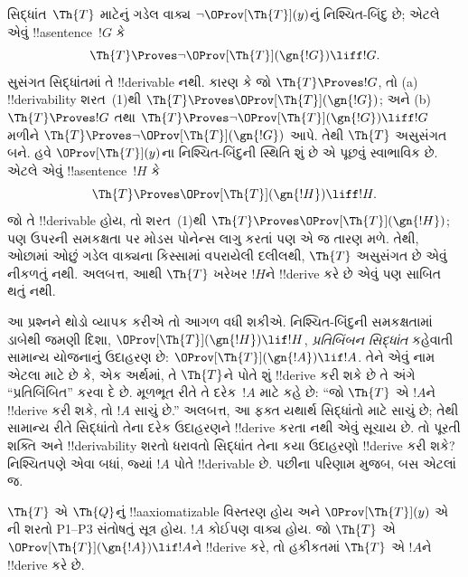 \documentclass[../../../include/open-logic-section]{subfiles}
\begin{document}


સિદ્ધાંત~$\Th{T}$ માટેનું ગડેલ વાક્ય $\lnot\OProv[\Th{T}](y)$નું નિશ્ચિત-બિંદુ છે; એટલે એવું !!a{sentence}~$!G$ કે
\[
\Th{T} \Proves \lnot \OProv[\Th{T}](\gn{!G}) \liff !G.
\]
સુસંગત સિદ્ધાંતમાં તે !!{derivable} નથી. કારણ કે જો $\Th{T} \Proves !G$, તો (a) !!{derivability} શરત~(1)થી $\Th{T} \Proves \OProv[\Th{T}](\gn{!G})$; અને (b) $\Th{T} \Proves !G$ તથા $\Th{T} \Proves \lnot \OProv[\Th{T}](\gn{!G}) \liff !G$ મળીને $\Th{T} \Proves \lnot \OProv[\Th{T}](\gn{!G})$ આપે. તેથી $\Th{T}$ અસુસંગત બને. હવે $\OProv[\Th{T}](y)$ના નિશ્ચિત-બિંદુની સ્થિતિ શું છે એ પૂછવું સ્વાભાવિક છે. એટલે એવું !!a{sentence}~$!H$ કે
\[
\Th{T} \Proves \OProv[\Th{T}](\gn{!H}) \liff !H.
\]
જો તે !!{derivable} હોય, તો શરત~(1)થી $\Th{T} \Proves \OProv[\Th{T}](\gn{!H})$; પણ ઉપરની સમકક્ષતા પર મોડસ પોનેન્સ લાગુ કરતાં પણ એ જ તારણ મળે. તેથી, ઓછામાં ઓછું ગડેલ વાક્યના કિસ્સામાં વપરાયેલી દલીલથી, $\Th{T}$ અસુસંગત છે એવું નીકળતું નથી. અલબત્ત, આથી $\Th{T}$ ખરેખર $!H$ને !!{derive} કરે છે એવું પણ સાબિત થતું નથી.

આ પ્રશ્નને થોડો વ્યાપક કરીએ તો આગળ વધી શકીએ. નિશ્ચિત-બિંદુની સમકક્ષતામાં ડાબેથી જમણી દિશા, $\OProv[\Th{T}](\gn{!H}) \lif !H$, \emph{પ્રતિબિંબન સિદ્ધાંત} કહેવાતી સામાન્ય યોજનાનું ઉદાહરણ છે: $\OProv[\Th{T}](\gn{!A}) \lif !A$. તેને એવું નામ એટલા માટે છે કે, એક અર્થમાં, તે $\Th{T}$ને પોતે શું !!{derive} કરી શકે છે તે અંગે ``પ્રતિબિંબિત'' કરવા દે છે. મૂળભૂત રીતે તે દરેક~$!A$ માટે કહે છે: ``જો $\Th{T}$ એ $!A$ને !!{derive} કરી શકે, તો $!A$ સાચું છે.'' અલબત્ત, આ ફક્ત યથાર્થ સિદ્ધાંતો માટે સાચું છે; તેથી સામાન્ય રીતે સિદ્ધાંતો તેના દરેક ઉદાહરણને !!{derive} કરતા નથી એવું સૂચાય છે. તો પૂરતી શક્તિ અને !!{derivability} શરતો ધરાવતો સિદ્ધાંત તેના કયા ઉદાહરણો !!{derive} કરી શકે? નિશ્ચિતપણે એવા બધાં, જ્યાં $!A$ પોતે !!{derivable} છે. પછીના પરિણામ મુજબ, બસ એટલાં જ.

\begin{thm}
$\Th{T}$ એ $\Th{Q}$નું !!a{axiomatizable} વિસ્તરણ હોય અને $\OProv[\Th{T}](y)$ એ ની શરતો P1--P3 સંતોષતું સૂત્ર હોય. $!A$ કોઈપણ વાક્ય હોય. જો $\Th{T}$ એ $\OProv[\Th{T}](\gn{!A}) \lif !A$ને !!{derive} કરે, તો હકીકતમાં $\Th{T}$ એ $!A$ને !!{derive} કરે છે.
\end{thm}
\end{document}
